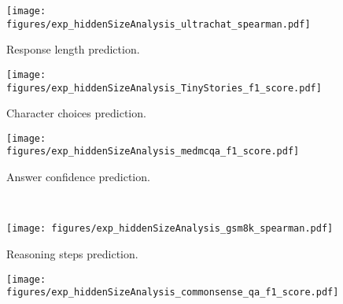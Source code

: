\begin{figure*}[tb!] 
    \centering
    \renewcommand{\thesubfigure}{\alph{mycounter}}  %

    \setcounter{mycounter}{1}
    \begin{subfigure}[b]{0.32\linewidth}
        \centering
        \texttt{[image: figures/exp\_hiddenSizeAnalysis\_ultrachat\_spearman.pdf]}
        \caption{Response length prediction.}
        \label{fig:exp_response_length_hiddenSize}
    \end{subfigure}
    \hfill
    \setcounter{mycounter}{3}
    \begin{subfigure}[b]{0.32\linewidth}
        \centering
        \texttt{[image: figures/exp\_hiddenSizeAnalysis\_TinyStories\_f1\_score.pdf]}
        \caption{Character choices prediction.}
        \label{fig:exp_character_choices_hiddenSize}
    \end{subfigure}
    \hfill
    \setcounter{mycounter}{5}
    \begin{subfigure}[b]{0.32\linewidth}
        \centering
        \texttt{[image: figures/exp\_hiddenSizeAnalysis\_medmcqa\_f1\_score.pdf]}
        \caption{Answer confidence prediction.}
        \label{fig:exp_answer_confidence_hiddenSize}
    \end{subfigure}
    \\
    \setcounter{mycounter}{2}
    \begin{subfigure}[b]{0.32\linewidth}
        \centering
        \texttt{[image: figures/exp\_hiddenSizeAnalysis\_gsm8k\_spearman.pdf]}
        \caption{Reasoning steps prediction.}
        \label{fig:exp_reasoning_steps_hiddenSize}
    \end{subfigure}
    \hfill
    \setcounter{mycounter}{4}
    \begin{subfigure}[b]{0.32\linewidth}
        \centering
        \texttt{[image: figures/exp\_hiddenSizeAnalysis\_commonsense\_qa\_f1\_score.pdf]}

\end{subfigure}
\end{figure*}
